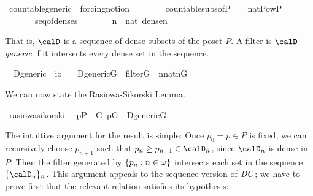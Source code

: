 \begin{isabelle}%
\isamarkupfalse%
\ countable{\isacharunderscore}generic\ {\isacharequal}\ forcing{\isacharunderscore}notion\ {\isacharplus}\isanewline
\ \ \ {\isasymD}\isanewline
\ \ \ countable{\isacharunderscore}subs{\isacharunderscore}of{\isacharunderscore}P{\isacharcolon}\ \ {\isachardoublequoteopen}{\isasymD}\ {\isasymin}\ nat{\isasymrightarrow}Pow{\isacharparenleft}P{\isacharparenright}{\isachardoublequoteclose}\isanewline
\ \ \ \ \ \ \ seq{\isacharunderscore}of{\isacharunderscore}denses{\isacharcolon}\ \ \ \ \ \ \ \ {\isachardoublequoteopen}{\isasymforall}n\ {\isasymin}\ nat{\isachardot}\ dense{\isacharparenleft}{\isasymD}{\isacharbackquote}n{\isacharparenright}{\isachardoublequoteclose}
\end{isabelle}
%
That is, $\calD$ is a sequence of dense subsets of the poset $P$. A
filter is \emph{$\calD$-generic} if it intersects every dense set in
the sequence.

\begin{isabelle}%
\isamarkupfalse%
\ \ D{\isacharunderscore}generic\ {\isacharcolon}{\isacharcolon}\ {\isachardoublequoteopen}i{\isasymRightarrow}o{\isachardoublequoteclose}\ \isanewline
\ \ {\isachardoublequoteopen}D{\isacharunderscore}generic{\isacharparenleft}G{\isacharparenright}\ {\isacharequal}{\isacharequal}\ filter{\isacharparenleft}G{\isacharparenright}\ {\isasymand}\ {\isacharparenleft}{\isasymforall}n{\isasymin}nat{\isachardot}{\isacharparenleft}{\isasymD}{\isacharbackquote}n{\isacharparenright}{\isasyminter}G{\isasymnoteq}{}{\isacharparenright}{\isachardoublequoteclose}
\end{isabelle}

We can now state the Rasiowa-Sikorski Lemma.
\begin{isabelle}%
\isamarkupfalse%
\ rasiowa{\isacharunderscore}sikorski{\isacharcolon}\isanewline
\ \ {\isachardoublequoteopen}p{\isasymin}P\ {\isasymLongrightarrow}\ {\isasymexists}G{\isachardot}\ p{\isasymin}G\ {\isasymand}\ D{\isacharunderscore}generic{\isacharparenleft}G{\isacharparenright}{\isachardoublequoteclose}
\end{isabelle}

The intuitive argument for the result is simple: Once $p_0=p\in P$ is
fixed, we can recursively choose $p_{n+1}$ such that 
$p_n \geq p_{n+1}\in \calD_n$, since $\calD_n$ is dense in $P$. Then
the filter generated by $\{p_n : n\in \omega\}$ intersects each set in
the sequence $\{\calD_n\}_n$. This argument appeals to the sequence
version of $\mathit{DC}$; we have to prove first that the relevant relation
satisfies its hypothesis:

